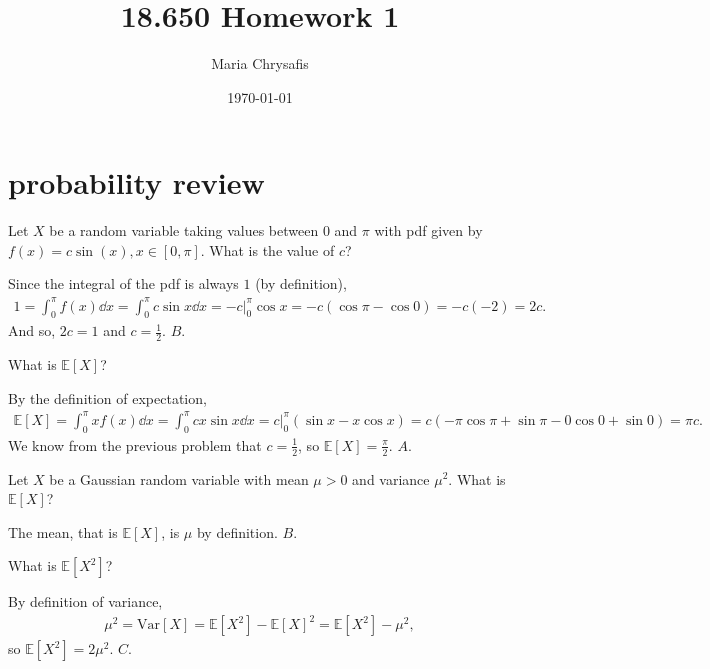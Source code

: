 \documentclass[a4paper]{article}
\author{Maria Chrysafis}
\date{\today}
\title{18.650 Homework 1}
\begin{document}
\maketitle
\section{probability review}
\begin{Exercise}
	Let $X$ be a random variable taking values between $0$ and $\pi$ with pdf given by $f(x) = c\sin(x), x \in [0, \pi].$ What is the value of $c$?
\end{Exercise}
\begin{Solution}
	Since the integral of the pdf is always $1$ (by definition),
	\begin{align*}
		1 = \int_{0}^{\pi} f(x) \dd{x} = \int_{0}^{\pi} c \sin x \dd{x} = -c \Big|_{0}^{\pi} \cos x = -c (\cos \pi - \cos 0) = -c (-2) = 2c. 
	\end{align*}
	And so, $2c = 1$ and $c = \frac{1}{2}$. $\boxed{B}$.
\end{Solution}
\begin{Exercise}
	What is $\mathbb{E}[X]$?
\end{Exercise}
\begin{Solution}
	By the definition of expectation, 
	\begin{align*}
		\mathbb{E}[X] = \int_{0}^{\pi} x f(x) \dd{x} = \int_0^{\pi} c x \sin x \dd{x} = c \Big|_0^{\pi} \left( \sin x - x \cos x \right) = c (-\pi \cos \pi + \sin \pi - 0 \cos 0 + \sin 0) = \pi c.
	\end{align*}
	We know from the previous problem that $c = \frac{1}{2}$, so $\mathbb{E}[X] = \frac{\pi}{2}.$ $\boxed{A}$.
\end{Solution}
\begin{Exercise}
	Let $X$ be a Gaussian random variable with mean $\mu >0$ and variance $\mu^2$. What is $\mathbb{E}[X]$?
\end{Exercise}
\begin{Solution}
	The mean, that is $\mathbb{E}[X]$, is $\mu$ by definition. $\boxed{B}$.
\end{Solution}
\begin{Exercise}
	What is $\mathbb{E}[X^2]$?
\end{Exercise}
\begin{Solution}
	By definition of variance,
	\begin{align*}
		\mu^2 = \text{Var}[X] = \mathbb{E}[X^2] - \mathbb{E}[X]^2 = \mathbb{E}[X^2] - \mu^2,
	\end{align*}
	so $\mathbb{E}[X^2] = 2 \mu^2.$ $\boxed{C}$.
\end{Solution}
\end{document}
